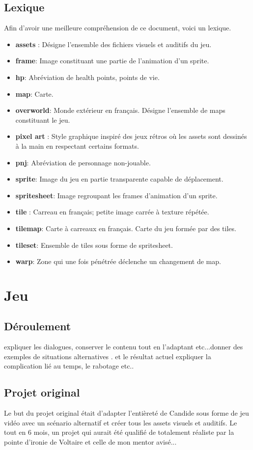 \documentclass[11pt]{article}
\begin{document}
\subsection{Lexique}
Afin d'avoir une meilleure compréhension de ce document, voici un lexique. \\
\begin{itemize}{}{}
\item \textbf{assets} : Désigne l'ensemble des fichiers visuels et auditifs du jeu.
\item \textbf{frame}: Image constituant une partie de l'animation d'un sprite.
\item \textbf{hp}: Abréviation de health points, points de vie.
\item \textbf{map}: Carte.
\item \textbf{overworld}: Monde extérieur en français. Désigne l'ensemble de maps constituant le jeu.
\item \textbf{pixel art} : Style graphique inspiré des jeux rétros où les assets sont dessinés à la main en respectant certains formats.
\item \textbf{pnj}: Abréviation de personnage non-jouable.
\item \textbf{sprite}: Image du jeu en partie transparente capable de déplacement.
\item \textbf{spritesheet}: Image regroupant les frames d'animation d'un sprite.
\item \textbf{tile} : Carreau en français; petite image carrée à texture répétée.
\item \textbf{tilemap}: Carte à carreaux en français. Carte du jeu formée par des tiles.
\item \textbf{tileset}: Ensemble de tiles sous forme de spritesheet.
\item \textbf{warp}: Zone qui une fois pénétrée déclenche un changement de map.
\end{itemize}

\section{Jeu}
\subsection{Déroulement}
expliquer les dialogues, conserver le contenu tout en l'adaptant etc...donner des exemples de situations alternatives . et le résultat actuel
expliquer la complication lié au temps, le rabotage etc..
\subsection{Projet original}
Le but du projet original était d'adapter l'entièreté de Candide sous forme de jeu vidéo avec un scénario alternatif et créer tous les assets visuels et auditifs. Le tout en 6 mois, un projet qui aurait été qualifié de totalement réaliste par la pointe d'ironie de Voltaire et celle de mon mentor avisé...\\
\end{document}
